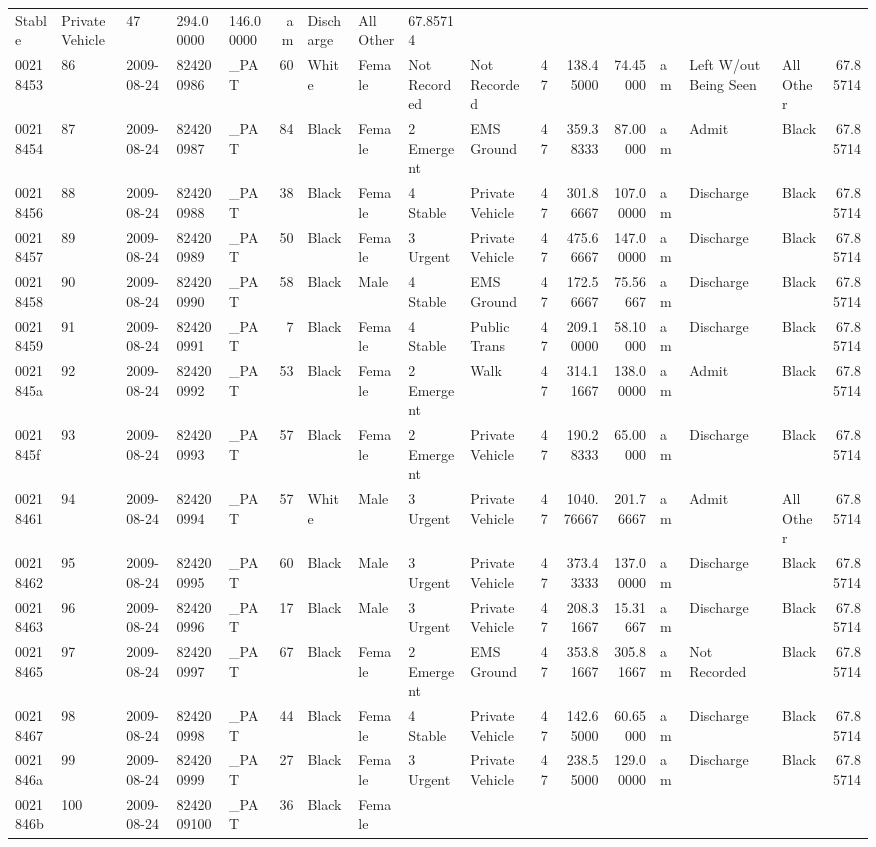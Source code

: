 \documentclass[]{elsarticle} %
\begin{document}
\begin{longtable}[]{@{}lllllrllllrrrlllr@{}}
Stable & Private Vehicle & 47 & 294.00000 & 146.00000 & am & Discharge &
All Other & 67.85714\tabularnewline
00218453 & 86 & 2009-08-24 & 824200986 & \_PAT & 60 & White & Female &
Not Recorded & Not Recorded & 47 & 138.45000 & 74.45000 & am & Left
W/out Being Seen & All Other & 67.85714\tabularnewline
00218454 & 87 & 2009-08-24 & 824200987 & \_PAT & 84 & Black & Female & 2
Emergent & EMS Ground & 47 & 359.38333 & 87.00000 & am & Admit & Black &
67.85714\tabularnewline
00218456 & 88 & 2009-08-24 & 824200988 & \_PAT & 38 & Black & Female & 4
Stable & Private Vehicle & 47 & 301.86667 & 107.00000 & am & Discharge &
Black & 67.85714\tabularnewline
00218457 & 89 & 2009-08-24 & 824200989 & \_PAT & 50 & Black & Female & 3
Urgent & Private Vehicle & 47 & 475.66667 & 147.00000 & am & Discharge &
Black & 67.85714\tabularnewline
00218458 & 90 & 2009-08-24 & 824200990 & \_PAT & 58 & Black & Male & 4
Stable & EMS Ground & 47 & 172.56667 & 75.56667 & am & Discharge & Black
& 67.85714\tabularnewline
00218459 & 91 & 2009-08-24 & 824200991 & \_PAT & 7 & Black & Female & 4
Stable & Public Trans & 47 & 209.10000 & 58.10000 & am & Discharge &
Black & 67.85714\tabularnewline
0021845a & 92 & 2009-08-24 & 824200992 & \_PAT & 53 & Black & Female & 2
Emergent & Walk & 47 & 314.11667 & 138.00000 & am & Admit & Black &
67.85714\tabularnewline
0021845f & 93 & 2009-08-24 & 824200993 & \_PAT & 57 & Black & Female & 2
Emergent & Private Vehicle & 47 & 190.28333 & 65.00000 & am & Discharge
& Black & 67.85714\tabularnewline
00218461 & 94 & 2009-08-24 & 824200994 & \_PAT & 57 & White & Male & 3
Urgent & Private Vehicle & 47 & 1040.76667 & 201.76667 & am & Admit &
All Other & 67.85714\tabularnewline
00218462 & 95 & 2009-08-24 & 824200995 & \_PAT & 60 & Black & Male & 3
Urgent & Private Vehicle & 47 & 373.43333 & 137.00000 & am & Discharge &
Black & 67.85714\tabularnewline
00218463 & 96 & 2009-08-24 & 824200996 & \_PAT & 17 & Black & Male & 3
Urgent & Private Vehicle & 47 & 208.31667 & 15.31667 & am & Discharge &
Black & 67.85714\tabularnewline
00218465 & 97 & 2009-08-24 & 824200997 & \_PAT & 67 & Black & Female & 2
Emergent & EMS Ground & 47 & 353.81667 & 305.81667 & am & Not Recorded &
Black & 67.85714\tabularnewline
00218467 & 98 & 2009-08-24 & 824200998 & \_PAT & 44 & Black & Female & 4
Stable & Private Vehicle & 47 & 142.65000 & 60.65000 & am & Discharge &
Black & 67.85714\tabularnewline
0021846a & 99 & 2009-08-24 & 824200999 & \_PAT & 27 & Black & Female & 3
Urgent & Private Vehicle & 47 & 238.55000 & 129.00000 & am & Discharge &
Black & 67.85714\tabularnewline
0021846b & 100 & 2009-08-24 & 8242009100 & \_PAT & 36 & Black & Female &

\end{longtable}
\end{document}
